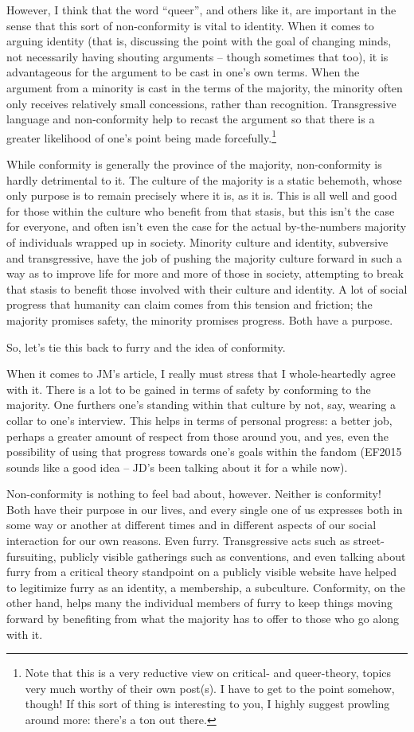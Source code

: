 However, I think that the word ``queer'', and others like it, are important in the sense that this sort of non-conformity is vital to identity. When it comes to arguing identity (that is, discussing the point with the goal of changing minds, not necessarily having shouting arguments -- though sometimes that too), it is advantageous for the argument to be cast in one’s own terms. When the argument from a minority is cast in the terms of the majority, the minority often only receives relatively small concessions, rather than recognition. Transgressive language and non-conformity help to recast the argument so that there is a greater likelihood of one’s point being made forcefully.\footnote{Note that this is a very reductive view on critical- and queer-theory, topics very much worthy of their own post(s). I have to get to the point somehow, though! If this sort of thing is interesting to you, I highly suggest prowling around more: there’s a ton out there.}

While conformity is generally the province of the majority, non-conformity is hardly detrimental to it. The culture of the majority is a static behemoth, whose only purpose is to remain precisely where it is, as it is. This is all well and good for those within the culture who benefit from that stasis, but this isn’t the case for everyone, and often isn’t even the case for the actual by-the-numbers majority of individuals wrapped up in society. Minority culture and identity, subversive and transgressive, have the job of pushing the majority culture forward in such a way as to improve life for more and more of those in society, attempting to break that stasis to benefit those involved with their culture and identity. A lot of social progress that humanity can claim comes from this tension and friction; the majority promises safety, the minority promises progress. Both have a purpose.

So, let’s tie this back to furry and the idea of conformity.

When it comes to JM’s article, I really must stress that I whole-heartedly agree with it. There is a lot to be gained in terms of safety by conforming to the majority. One furthers one’s standing within that culture by not, say, wearing a collar to one’s interview. This helps in terms of personal progress: a better job, perhaps a greater amount of respect from those around you, and yes, even the possibility of using that progress towards one’s goals within the fandom (EF2015 sounds like a good idea -- JD’s been talking about it for a while now).

Non-conformity is nothing to feel bad about, however. Neither is conformity! Both have their purpose in our lives, and every single one of us expresses both in some way or another at different times and in different aspects of our social interaction for our own reasons. Even furry. Transgressive acts such as street-fursuiting, publicly visible gatherings such as conventions, and even talking about furry from a critical theory standpoint on a publicly visible website have helped to legitimize furry as an identity, a membership, a subculture. Conformity, on the other hand, helps many the individual members of furry to keep things moving forward by benefiting from what the majority has to offer to those who go along with it.
